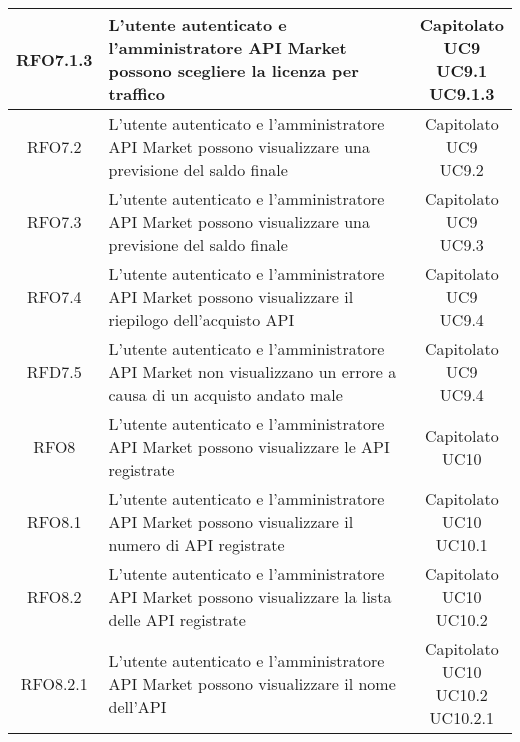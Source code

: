 \begin{longtable}{|c|p{8cm}|c|}
RFO7.1.3 &  L'utente autenticato e l'amministratore API Market possono scegliere la licenza per traffico & \makecell*{Capitolato\\UC9\\UC9.1\\UC9.1.3} \\
\hline

RFO7.2 &  L'utente autenticato e l'amministratore API Market possono visualizzare una previsione del saldo finale & \makecell*{Capitolato\\UC9\\UC9.2} \\
\hline

RFO7.3 & L'utente autenticato e l'amministratore API Market possono visualizzare una previsione del saldo finale & \makecell*{Capitolato\\UC9\\UC9.3} \\
\hline

RFO7.4 &  L'utente autenticato e l'amministratore API Market possono visualizzare il riepilogo dell'acquisto API & \makecell*{Capitolato\\UC9\\UC9.4} \\
\hline

RFD7.5 &  L'utente autenticato e l'amministratore API Market non visualizzano un errore a causa di un acquisto andato male & \makecell*{Capitolato\\UC9\\UC9.4} \\
\hline

RFO8 &  L'utente autenticato e l'amministratore API Market possono visualizzare le API registrate & \makecell*{Capitolato\\UC10} \\
\hline

RFO8.1 &  L'utente autenticato e l'amministratore API Market possono visualizzare il numero di API registrate & \makecell*{Capitolato\\UC10\\UC10.1} \\
\hline

RFO8.2 &  L'utente autenticato e l'amministratore API Market possono visualizzare la lista delle API registrate & \makecell*{Capitolato\\UC10\\UC10.2} \\
\hline

RFO8.2.1 &  L'utente autenticato e l'amministratore API Market possono visualizzare il nome dell'API & \makecell*{Capitolato\\UC10\\UC10.2\\UC10.2.1} \\
\hline


\end{longtable}
